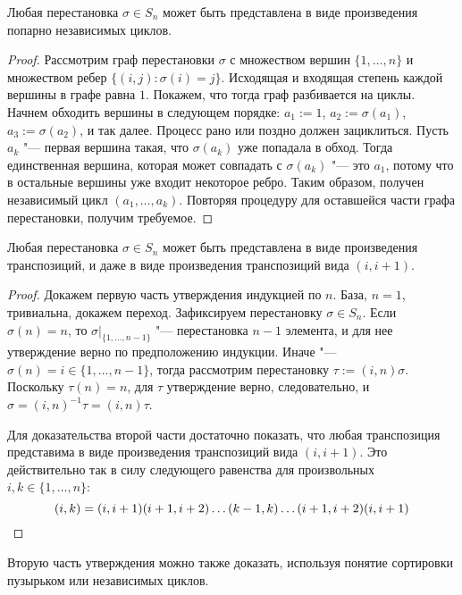 \begin{proposition}
	Любая перестановка $\sigma \in S_n$ может быть представлена в виде произведения попарно независимых циклов.
\end{proposition}

\begin{proof}
	Рассмотрим граф перестановки $\sigma$ с множеством вершин $\{1, \dots, n\}$ и множеством ребер $\{(i, j): \sigma(i) = j\}$. Исходящая и входящая степень каждой вершины в графе равна $1$. Покажем, что тогда граф разбивается на циклы. Начнем обходить вершины в следующем порядке: $a_1 := 1$, $a_2 := \sigma(a_1)$, $a_3 := \sigma(a_2)$, и так далее. Процесс рано или поздно должен зациклиться. Пусть $a_k$ "--- первая вершина такая, что $\sigma(a_k)$ уже попадала в обход. Тогда единственная вершина, которая может совпадать с $\sigma(a_k)$ "--- это $a_1$, потому что в остальные вершины уже входит некоторое ребро. Таким образом, получен независимый цикл $(a_1, \dots, a_k)$. Повторяя процедуру для оставшейся части графа перестановки, получим требуемое.
\end{proof}

\begin{proposition}
	Любая перестановка $\sigma \in S_n$  может быть представлена в виде произведения транспозиций, и даже в виде произведения транспозиций вида $(i, i+1)$.
\end{proposition}

\begin{proof}
	Докажем первую часть утверждения индукцией по $n$. База, $n = 1$, тривиальна, докажем переход. Зафиксируем перестановку $\sigma \in S_n$. Если $\sigma(n) = n$, то $\sigma|_{\{1, \dots, n-1\}}$ "--- перестановка $n-1$ элемента, и для нее утверждение верно по предположению индукции. Иначе "--- $\sigma(n) = i \in \{1,\dots, n - 1\}$, тогда рассмотрим перестановку $\tau := (i, n)\sigma$. Поскольку $\tau(n) = n$,  для $\tau$ утверждение верно, следовательно, и $\sigma = (i, n)^{-1}\tau = (i, n)\tau$.
		
	Для доказательства второй части достаточно показать, что любая транспозиция представима в виде произведения транспозиций вида $(i, i + 1)$. Это действительно так в силу следующего равенства для произвольных $i, k \in \{1, \dotsc, n\}$: \[(i, k) = (i, i+1)(i + 1, i+2)\dots(k - 1, k)\dots(i + 1, i + 2)(i, i + 1)\qedhere\]
\end{proof}

\begin{note}
	Вторую часть утверждения можно также доказать, используя понятие сортировки пузырьком или независимых циклов.
\end{note}

